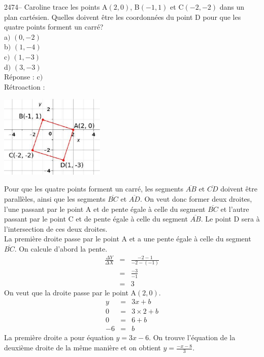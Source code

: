 \documentclass[letterpaper, 12pt]{article}
\begin{document}
2474-- Caroline trace les points A$(2, 0)$, B$(-1, 1)$ et C$(-2, -2)$ dans un plan cart\'esien. Quelles doivent \^etre les coordonn\'ees du point D pour que les quatre points forment un carr\'e?\\

a$)$ $(0, -2)$\\
b$)$ $(1, -4)$\\
c$)$ $(1, -3)$\\
d$)$ $(3, -3)$\\

R\'eponse : c$)$\\

R\'etroaction :\\
\begin{center}
 \includegraphics[width=5cm,bb=14 14 378 300]{Q2474.eps}
\end{center}
Pour que les quatre points forment un carr\'e, les segments $\overline{AB}$ et $\overline{CD}$ doivent \^etre parall\`eles, ainsi que les segments $\overline{BC}$ et $\overline{AD}$. On veut donc former deux droites, l'une passant par le point A et de pente \'egale \`a celle du segment $\overline{BC}$ et l'autre passant par le point C et de pente \'egale \`a celle du segment $\overline{AB}$. Le point D sera \`a l'intersection de ces deux droites.\\
La premi\`ere droite passe par le point A et a une pente \'egale \`a celle du segment $\overline{BC}$. On calcule d'abord la pente.
\begin{eqnarray*}
\frac{\Delta Y}{\Delta X}&=&\frac{-2-1}{-2-(-1)} \\[2mm]
&=&\frac{-3}{-1} \\[2mm]
&=&3
\end{eqnarray*}
On veut que la droite passe par le point A$(2, 0)$.
\begin{eqnarray*}
 y&=&3x+b\\
 0&=&3\times2+b\\
 0&=&6+b\\
 -6&=&b
\end{eqnarray*}
La premi\`ere droite a pour \'equation $y=3x-6$. On trouve l'\'equation de la deuxi\`eme droite de la m\^eme mani\`ere et on obtient $y=\frac{-x-8}{3}$.
\end{document}
